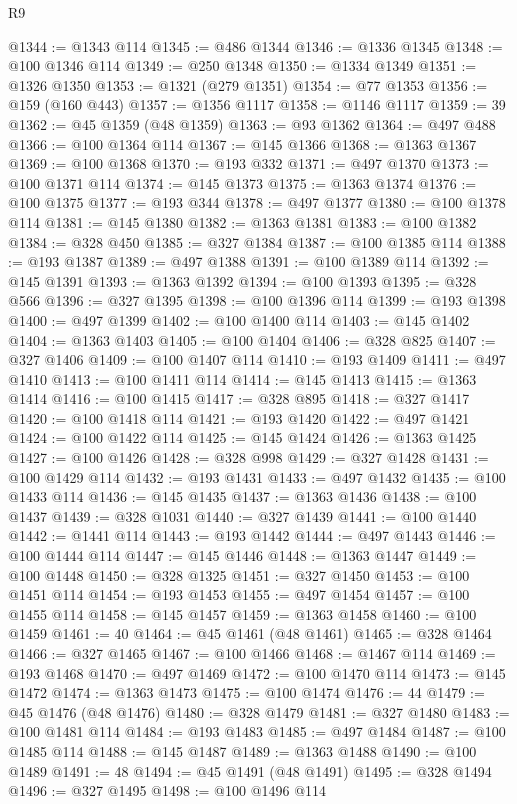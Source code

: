 \begin{lexlean}{R9}
\begin{coremodule}
@1344 := @1343 @114
@1345 := @486 @1344
@1346 := @1336 @1345
@1348 := @100 @1346 @114
@1349 := @250 @1348
@1350 := @1334 @1349
@1351 := @1326 @1350
@1353 := @1321 (@279 @1351)
@1354 := @77 @1353
@1356 := @159 (@160 @443)
@1357 := @1356 @1117
@1358 := @1146 @1117
@1359 := 39
@1362 := @45 @1359 (@48 @1359)
@1363 := @93 @1362
@1364 := @497 @488
@1366 := @100 @1364 @114
@1367 := @145 @1366
@1368 := @1363 @1367
@1369 := @100 @1368
@1370 := @193 @332
@1371 := @497 @1370
@1373 := @100 @1371 @114
@1374 := @145 @1373
@1375 := @1363 @1374
@1376 := @100 @1375
@1377 := @193 @344
@1378 := @497 @1377
@1380 := @100 @1378 @114
@1381 := @145 @1380
@1382 := @1363 @1381
@1383 := @100 @1382
@1384 := @328 @450
@1385 := @327 @1384
@1387 := @100 @1385 @114
@1388 := @193 @1387
@1389 := @497 @1388
@1391 := @100 @1389 @114
@1392 := @145 @1391
@1393 := @1363 @1392
@1394 := @100 @1393
@1395 := @328 @566
@1396 := @327 @1395
@1398 := @100 @1396 @114
@1399 := @193 @1398
@1400 := @497 @1399
@1402 := @100 @1400 @114
@1403 := @145 @1402
@1404 := @1363 @1403
@1405 := @100 @1404
@1406 := @328 @825
@1407 := @327 @1406
@1409 := @100 @1407 @114
@1410 := @193 @1409
@1411 := @497 @1410
@1413 := @100 @1411 @114
@1414 := @145 @1413
@1415 := @1363 @1414
@1416 := @100 @1415
@1417 := @328 @895
@1418 := @327 @1417
@1420 := @100 @1418 @114
@1421 := @193 @1420
@1422 := @497 @1421
@1424 := @100 @1422 @114
@1425 := @145 @1424
@1426 := @1363 @1425
@1427 := @100 @1426
@1428 := @328 @998
@1429 := @327 @1428
@1431 := @100 @1429 @114
@1432 := @193 @1431
@1433 := @497 @1432
@1435 := @100 @1433 @114
@1436 := @145 @1435
@1437 := @1363 @1436
@1438 := @100 @1437
@1439 := @328 @1031
@1440 := @327 @1439
@1441 := @100 @1440
@1442 := @1441 @114
@1443 := @193 @1442
@1444 := @497 @1443
@1446 := @100 @1444 @114
@1447 := @145 @1446
@1448 := @1363 @1447
@1449 := @100 @1448
@1450 := @328 @1325
@1451 := @327 @1450
@1453 := @100 @1451 @114
@1454 := @193 @1453
@1455 := @497 @1454
@1457 := @100 @1455 @114
@1458 := @145 @1457
@1459 := @1363 @1458
@1460 := @100 @1459
@1461 := 40
@1464 := @45 @1461 (@48 @1461)
@1465 := @328 @1464
@1466 := @327 @1465
@1467 := @100 @1466
@1468 := @1467 @114
@1469 := @193 @1468
@1470 := @497 @1469
@1472 := @100 @1470 @114
@1473 := @145 @1472
@1474 := @1363 @1473
@1475 := @100 @1474
@1476 := 44
@1479 := @45 @1476 (@48 @1476)
@1480 := @328 @1479
@1481 := @327 @1480
@1483 := @100 @1481 @114
@1484 := @193 @1483
@1485 := @497 @1484
@1487 := @100 @1485 @114
@1488 := @145 @1487
@1489 := @1363 @1488
@1490 := @100 @1489
@1491 := 48
@1494 := @45 @1491 (@48 @1491)
@1495 := @328 @1494
@1496 := @327 @1495
@1498 := @100 @1496 @114

\end{coremodule}
\end{lexlean}

